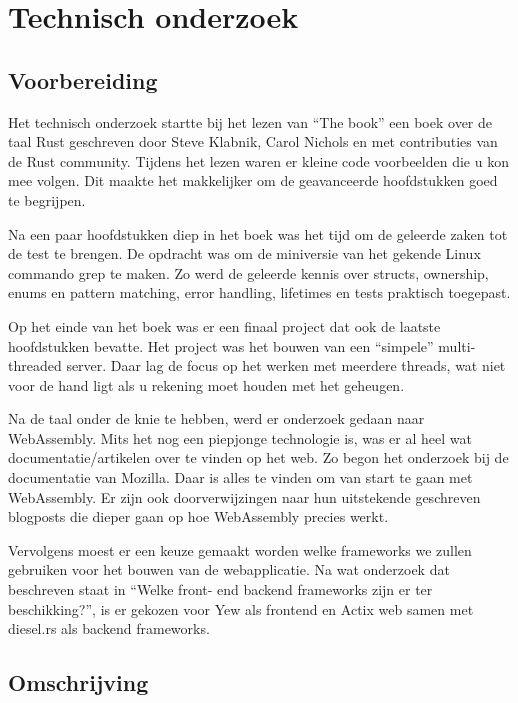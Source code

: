 \chapter{Technisch onderzoek}

\section{Voorbereiding}

Het technisch onderzoek startte bij het lezen van “The book” een boek over de taal Rust geschreven
door Steve Klabnik, Carol Nichols en met contributies van de Rust community. Tijdens het lezen waren
er kleine code voorbeelden die u kon mee volgen. Dit maakte het makkelijker om de geavanceerde
hoofdstukken goed te begrijpen. 

Na een paar hoofdstukken diep in het boek was het tijd om de geleerde zaken tot de test te brengen.
De opdracht was om de miniversie van het gekende Linux commando grep te maken. Zo werd de geleerde
kennis over structs, ownership, enums en pattern matching, error handling, lifetimes en tests
praktisch toegepast.  

Op het einde van het boek was er een finaal project dat ook de laatste hoofdstukken bevatte. Het
project was het bouwen van een “simpele” multi-threaded server. Daar lag de focus op het werken met
meerdere threads, wat niet voor de hand ligt als u rekening moet houden met het geheugen. 

Na de taal onder de knie te hebben, werd er onderzoek gedaan naar WebAssembly. Mits het nog een
piepjonge technologie is, was er al heel wat documentatie/artikelen over te vinden op het web. Zo
begon het onderzoek bij de documentatie van Mozilla. Daar is alles te vinden om van start te gaan
met WebAssembly. Er zijn ook doorverwijzingen naar hun uitstekende geschreven blogposts die dieper
gaan op hoe WebAssembly precies werkt.

Vervolgens moest er een keuze gemaakt worden welke frameworks we zullen gebruiken voor het bouwen
van de webapplicatie. Na wat onderzoek dat beschreven staat in “Welke front- end backend frameworks
zijn er ter beschikking?”, is er gekozen voor Yew als frontend en Actix web samen met diesel.rs als
backend frameworks.

\clearpage

\section{Omschrijving}

